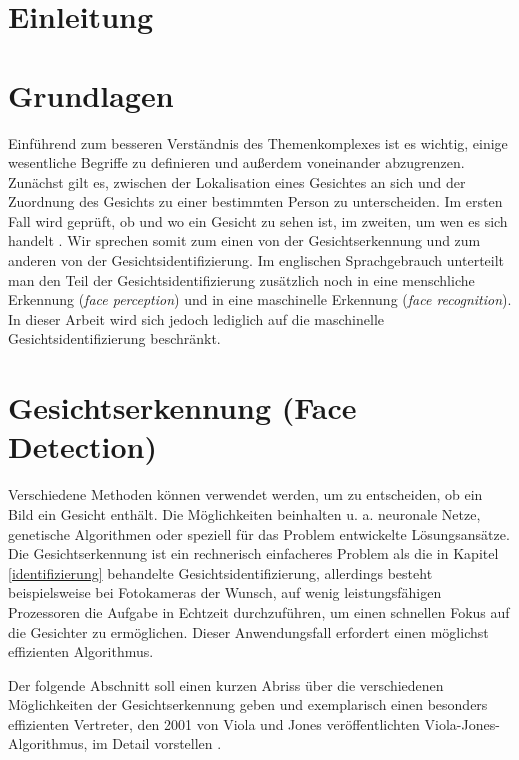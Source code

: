 \documentclass[doktyp=semarbeit, sprache=german]{TUBAFarbeiten}
\begin{document}
\maketitle
\tableofcontents
\newpage
\section{Einleitung}
\section{Grundlagen}
Einführend zum besseren Verständnis des Themenkomplexes ist es wichtig, einige wesentliche Begriffe zu definieren und außerdem voneinander abzugrenzen. Zunächst gilt es, zwischen der Lokalisation eines Gesichtes an sich und der Zuordnung des Gesichts zu einer bestimmten Person zu unterscheiden. Im ersten Fall wird geprüft, ob und wo ein Gesicht zu sehen ist, im zweiten, um wen es sich handelt \cite{FaceRecognitionWikipedia}. Wir sprechen somit zum einen von der Gesichtserkennung und zum anderen von der Gesichtsidentifizierung. Im englischen Sprachgebrauch unterteilt man den Teil der Gesichtsidentifizierung zusätzlich noch in eine menschliche Erkennung (\textit{face perception}) und in eine maschinelle Erkennung (\textit{face recognition}). In dieser Arbeit wird sich jedoch lediglich auf die maschinelle Gesichtsidentifizierung beschränkt.
\newpage
\section{Gesichtserkennung (Face Detection)}

Verschiedene Methoden können verwendet werden, um zu entscheiden, ob ein Bild ein Gesicht enthält. Die Möglichkeiten beinhalten u. a. neuronale Netze, genetische Algorithmen oder speziell für das Problem entwickelte Lösungsansätze. Die Gesichtserkennung ist ein rechnerisch einfacheres Problem als die in Kapitel \ref{identifizierung} behandelte Gesichtsidentifizierung, allerdings besteht beispielsweise bei Fotokameras der Wunsch, auf wenig leistungsfähigen Prozessoren die Aufgabe in Echtzeit durchzuführen, um einen schnellen Fokus auf die Gesichter zu ermöglichen. Dieser Anwendungsfall erfordert einen möglichst effizienten Algorithmus.  

Der folgende Abschnitt soll einen kurzen Abriss über die verschiedenen Möglichkeiten der Gesichtserkennung geben und exemplarisch einen besonders effizienten Vertreter, den 2001 von Viola und Jones veröffentlichten Viola-Jones-Algorithmus, im Detail vorstellen \cite{Viola01rapidobject}.
\end{document}
